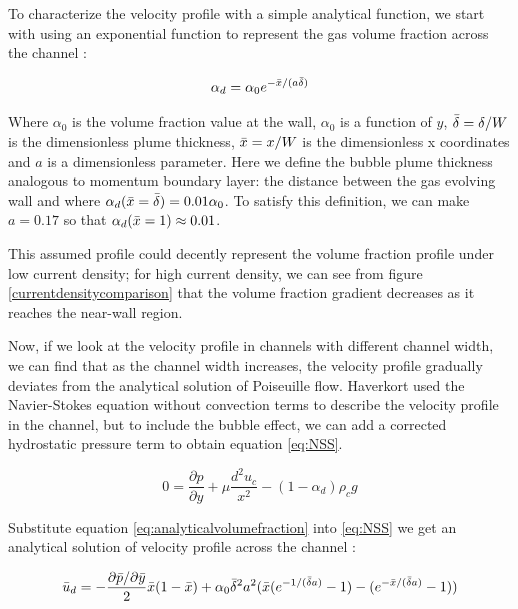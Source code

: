 To characterize the velocity profile with a simple analytical function, we start with using an exponential function to represent the gas volume fraction across the channel \cite{Haverkort2020}:

\begin{equation}\label{eq:analyticalvolumefraction}
    \alpha_d = \alpha_0 e^{-\Bar{x}/(a\Bar{\delta})}
\end{equation}

Where $\alpha_0$ is the volume fraction value at the wall, $\alpha_0$ is a function of $y$, $\Bar{\delta}=\delta / W$ is the dimensionless plume thickness, $\Bar{x}=x/W$ is the dimensionless x coordinates and $a$ is a dimensionless parameter. Here we define the bubble plume thickness analogous to momentum boundary layer: the distance between the gas evolving wall and where $\alpha_d ( \Bar{x} = \Bar{\delta}) = 0.01\alpha_0$. To satisfy this definition, we can make $a = 0.17$ so that $\alpha_d (\Bar{x} = 1) \approx 0.01 $.

This assumed profile could decently represent the volume fraction profile under low current density; for high current density, we can see from figure \ref{currentdensitycomparison} that the volume fraction gradient decreases as it reaches the near-wall region. 

Now, if we look at the velocity profile in channels with different channel width, we can find that as the channel width increases, the velocity profile gradually deviates from the analytical solution of Poiseuille flow. Haverkort \cite{Haverkort2020} used the Navier-Stokes equation without convection terms to describe the velocity profile in the channel, but to include the bubble effect, we can add a corrected hydrostatic pressure term to obtain equation \ref{eq:NSS}.

\begin{equation}\label{eq:NSS}
    0 = \frac{\partial p}{\partial y} +\mu \frac{d^2u_c}{x^2} -(1-\alpha_d)\rho_c g
\end{equation}

Substitute equation \ref{eq:analyticalvolumefraction} into \ref{eq:NSS} we get an analytical solution of velocity profile across the channel \cite{Haverkort2020}:

\begin{equation}\label{eq:velocityanalytical}
    \Bar{u}_d = -\frac{\partial\Bar{p} /\partial \Bar{y}}{2} \Bar{x}(1-\Bar{x}) +\alpha_0 \Bar{\delta}^2a^2(\Bar{x}(e^{-1/(\Bar{\delta}a)}-1)-(e^{-\Bar{x}/(\Bar{\delta}a)}-1))
\end{equation}

